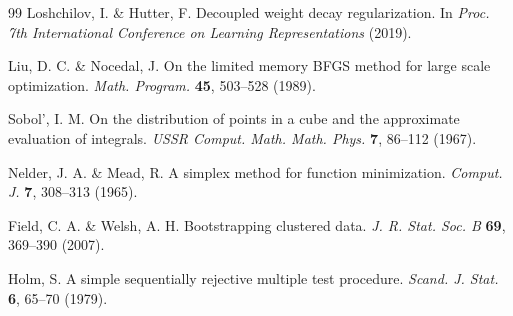 \begin{thebibliography}{99}
 Loshchilov, I. \& Hutter, F. Decoupled weight decay regularization. In \textit{Proc. 7th International Conference on Learning Representations} (2019).

 Liu, D. C. \& Nocedal, J. On the limited memory BFGS method for large scale optimization. \textit{Math. Program.} \textbf{45}, 503--528 (1989).

 Sobol', I. M. On the distribution of points in a cube and the approximate evaluation of integrals. \textit{USSR Comput. Math. Math. Phys.} \textbf{7}, 86--112 (1967).

 Nelder, J. A. \& Mead, R. A simplex method for function minimization. \textit{Comput. J.} \textbf{7}, 308--313 (1965).

 Field, C. A. \& Welsh, A. H. Bootstrapping clustered data. \textit{J. R. Stat. Soc. B} \textbf{69}, 369--390 (2007).

 Holm, S. A simple sequentially rejective multiple test procedure. \textit{Scand. J. Stat.} \textbf{6}, 65--70 (1979).

\end{thebibliography}
